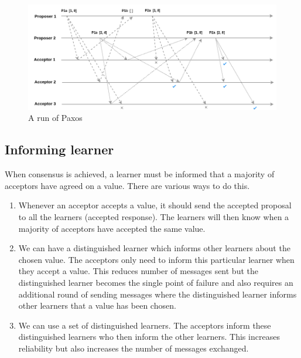 \begin{figure}
\centering
\includegraphics[width=\textwidth]{figures/paxos_run.png}
\caption{A run of Paxos
\label{fig:myInlineFigure}}
\end{figure}

\vspace{-4mm}
\subsection{Informing learner}
When consensus is achieved, a learner must be informed that a majority of acceptors
have agreed on a value. There are various ways to do this.

\begin{enumerate}
  \item Whenever an acceptor accepts a value, it should send the accepted proposal
    to all the learners (\textsf{accepted response}).
    The learners will then know when a majority of acceptors
    have accepted the same value.
  \item We can have a distinguished learner which informs other learners about
    the chosen value. The acceptors only need to inform this particular learner
    when they accept a value. This reduces number of messages sent but the
    distinguished learner becomes the single point of failure and also requires
    an additional round of sending messages where the distinguished learner informs
    other learners that a value has been chosen.
  \item We can use a set of distinguished learners. The acceptors inform these
    distinguished learners who then inform the other learners. This increases
    reliability but also increases the number of messages exchanged.
\end{enumerate}

\vspace{-5mm}
